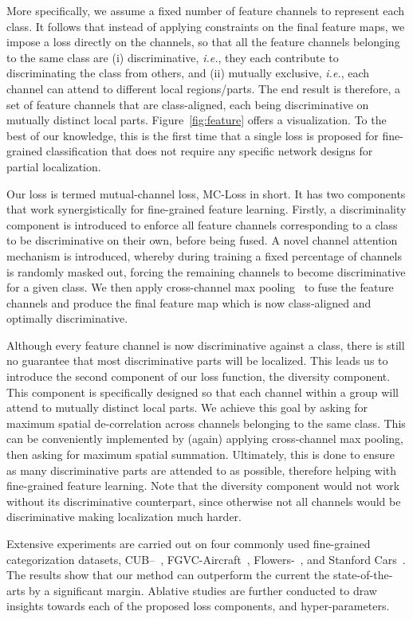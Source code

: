 \documentclass[journal]{IEEEtran}
\begin{document}
More specifically, we assume a fixed number of feature channels to represent each class. It follows that instead of applying constraints on the final feature maps, we impose a loss directly on the channels, so that all the feature channels belonging to the same class are (i) discriminative, \emph{i.e.}, they each contribute to discriminating the class from others, and (ii) mutually exclusive, \emph{i.e.}, each channel can attend to different local regions/parts. The end result is therefore, a set of feature channels that are class-aligned, each being discriminative on mutually distinct local parts. Figure~\ref{fig:feature} offers a visualization. To the best of our knowledge, this is the first time that a single loss is proposed for fine-grained classification that does not require any specific network designs for partial localization.

Our loss is termed mutual-channel loss, MC-Loss in short. It has two components that work synergistically for fine-grained feature learning. Firstly, a discriminality component is introduced to enforce all feature channels corresponding to a class to be discriminative on their own, before being fused. A novel channel attention mechanism is introduced, whereby during training a fixed percentage of channels is randomly masked out, forcing the remaining channels to become discriminative for a given class. We then apply  cross-channel max pooling~\cite{goodfellow2013maxout} to fuse the feature channels and produce the final feature map which is now class-aligned and optimally discriminative.

Although every feature channel is now discriminative against a class, there is still no guarantee that most discriminative parts will be localized. This leads us to introduce the second component of our loss function, the diversity component. This component is specifically designed so that each channel within a group will attend to mutually distinct local parts. We achieve this goal by asking for maximum spatial de-correlation across channels belonging to the same class. This can be conveniently implemented by (again) applying cross-channel max pooling, then asking for maximum spatial summation. Ultimately, this is done to ensure as many discriminative parts are attended to as possible, therefore helping with fine-grained feature learning. Note that the diversity component would not work without its discriminative counterpart, since otherwise not all channels would be discriminative making localization much harder.

Extensive experiments are carried out on four commonly used fine-grained categorization datasets, CUB--~\cite{wah2011caltech}, FGVC-Aircraft~\cite{maji2013fine}, Flowers-~\cite{nilsback2008automated}, and Stanford Cars~\cite{krause20133d}. The results show that our method can outperform the current the state-of-the-arts by a significant margin. Ablative studies are further conducted to draw insights towards each of the proposed loss components, and hyper-parameters.
\end{document}
